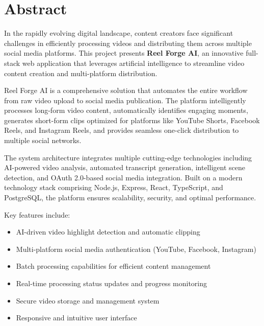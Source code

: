 \chapter*{Abstract}

\vspace{0.5cm}

In the rapidly evolving digital landscape, content creators face significant challenges in efficiently processing videos and distributing them across multiple social media platforms. This project presents \textbf{Reel Forge AI}, an innovative full-stack web application that leverages artificial intelligence to streamline video content creation and multi-platform distribution.

\vspace{0.5cm}

Reel Forge AI is a comprehensive solution that automates the entire workflow from raw video upload to social media publication. The platform intelligently processes long-form video content, automatically identifies engaging moments, generates short-form clips optimized for platforms like YouTube Shorts, Facebook Reels, and Instagram Reels, and provides seamless one-click distribution to multiple social networks.

\vspace{0.5cm}

The system architecture integrates multiple cutting-edge technologies including AI-powered video analysis, automated transcript generation, intelligent scene detection, and OAuth 2.0-based social media integration. Built on a modern technology stack comprising Node.js, Express, React, TypeScript, and PostgreSQL, the platform ensures scalability, security, and optimal performance.

\vspace{0.5cm}

Key features include:
\begin{itemize}[noitemsep]
    \item AI-driven video highlight detection and automatic clipping
    \item Multi-platform social media authentication (YouTube, Facebook, Instagram)
    \item Batch processing capabilities for efficient content management
    \item Real-time processing status updates and progress monitoring
    \item Secure video storage and management system
    \item Responsive and intuitive user interface
\end{itemize}

